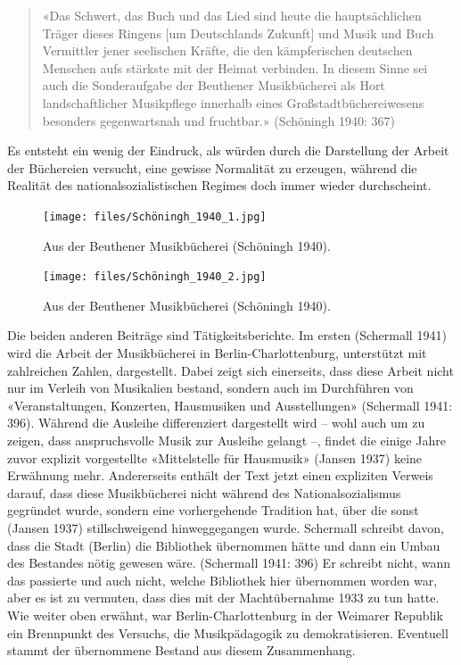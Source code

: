 \documentclass[a4paper,
fontsize=11pt,
oneside,
numbers=noperiodatend,
parskip=half-,
bibliography=totoc,
final
]{scrartcl}
\begin{document}
\begin{quote}
«Das Schwert, das Buch und das Lied sind heute die hauptsächlichen
Träger dieses Ringens {[}um Deutschlands Zukunft{]} und Musik und Buch
Vermittler jener seelischen Kräfte, die den kämpferischen deutschen
Menschen aufs stärkste mit der Heimat verbinden. In diesem Sinne sei
auch die Sonderaufgabe der Beuthener Musikbücherei als Hort
landschaftlicher Musikpflege innerhalb eines Großstadtbüchereiwesens
besonders gegenwartsnah und fruchtbar.» (Schöningh 1940: 367)
\end{quote}

Es entsteht ein wenig der Eindruck, als würden durch die Darstellung der
Arbeit der Büchereien versucht, eine gewisse Normalität zu erzeugen,
während die Realität des nationalsozialistischen Regimes doch immer
wieder durchscheint.

\begin{figure}
\centering
\texttt{[image: files/Schöningh\_1940\_1.jpg]}
\caption{Aus der Beuthener Musikbücherei (Schöningh 1940).}
\end{figure}

\begin{figure}
\centering
\texttt{[image: files/Schöningh\_1940\_2.jpg]}
\caption{Aus der Beuthener Musikbücherei (Schöningh 1940).}
\end{figure}

Die beiden anderen Beiträge sind Tätigkeitsberichte. Im ersten
(Schermall 1941) wird die Arbeit der Musikbücherei in
Berlin-Charlottenburg, unterstützt mit zahlreichen Zahlen, dargestellt.
Dabei zeigt sich einerseits, dass diese Arbeit nicht nur im Verleih von
Musikalien bestand, sondern auch im Durchführen von «Veranstaltungen,
Konzerten, Hausmusiken und Ausstellungen» (Schermall 1941: 396). Während
die Ausleihe differenziert dargestellt wird -- wohl auch um zu zeigen,
dass anspruchsvolle Musik zur Ausleihe gelangt --, findet die einige
Jahre zuvor explizit vorgestellte «Mittelstelle für Hausmusik» (Jansen
1937) keine Erwähnung mehr. Andererseits enthält der Text jetzt einen
expliziten Verweis darauf, dass diese Musikbücherei nicht während des
Nationalsozialismus gegründet wurde, sondern eine vorhergehende
Tradition hat, über die sonst (Jansen 1937) stillschweigend
hinweggegangen wurde. Schermall schreibt davon, dass die Stadt (Berlin)
die Bibliothek übernommen hätte und dann ein Umbau des Bestandes nötig
gewesen wäre. (Schermall 1941: 396) Er schreibt nicht, wann das
passierte und auch nicht, welche Bibliothek hier übernommen worden war,
aber es ist zu vermuten, dass dies mit der Machtübernahme 1933 zu tun
hatte. Wie weiter oben erwähnt, war Berlin-Charlottenburg in der
Weimarer Republik ein Brennpunkt des Versuchs, die Musikpädagogik zu
demokratisieren. Eventuell stammt der übernommene Bestand aus diesem
Zusammenhang.
\end{document}
